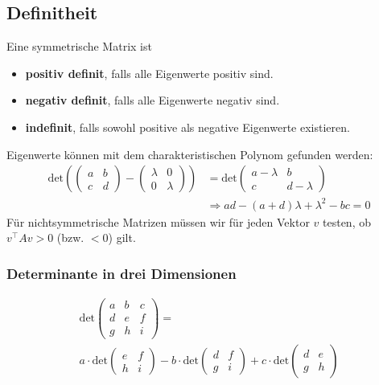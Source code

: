 \documentclass[a4paper,10pt]{article}
\begin{document}
\subsection{Definitheit}
Eine symmetrische Matrix ist
\begin{itemize}
  \item \textbf{positiv definit}, falls alle Eigenwerte positiv sind.
  \item \textbf{negativ definit}, falls alle Eigenwerte negativ sind.
  \item \textbf{indefinit}, falls sowohl positive als negative Eigenwerte existieren.
\end{itemize}
Eigenwerte können mit dem charakteristischen Polynom gefunden werden:
\begin{align*}
  \text{det} \left(
  \begin{pmatrix}
    a & b\\
    c & d
  \end{pmatrix}
  -
  \begin{pmatrix}
    \lambda & 0\\
    0 & \lambda
  \end{pmatrix}
  \right)
  &=
  \text{det}
  \begin{pmatrix}
    a - \lambda & b\\
    c & d - \lambda
  \end{pmatrix}\\
  &\Rightarrow ad - (a + d) \lambda + \lambda^2 - bc = 0
\end{align*}
Für nichtsymmetrische Matrizen müssen wir für jeden Vektor \(v\) testen, ob \(v^\top A v > 0\) (bzw. \(< 0\)) gilt.
\subsubsection*{Determinante in drei Dimensionen}
\begin{multline*}
  \text{det}
  \begin{pmatrix}
      a & b & c\\
      d & e & f\\
      g & h & i
  \end{pmatrix}
  =\\
  a \cdot \text{det}
  \begin{pmatrix}
    e & f\\
    h & i
  \end{pmatrix}
  - b \cdot \text{det}
  \begin{pmatrix}
    d & f\\
    g & i
  \end{pmatrix}
  + c \cdot \text{det}
  \begin{pmatrix}
    d & e\\
    g & h
  \end{pmatrix}
\end{multline*}
\end{document}
